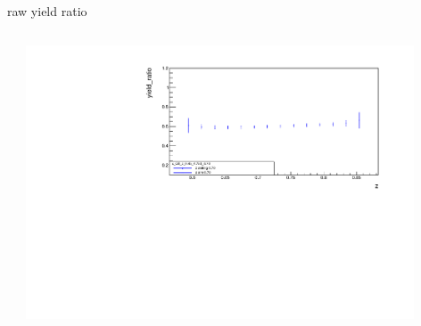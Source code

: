 \begin{frame}{raw yield ratio}
\begin{columns}
\begin{column}[T]{0.5\textwidth}
\end{column}
\begin{column}[T]{0.5\textwidth}
\includegraphics[width = 0.9\textwidth]{results/yield/statistics/x_Q2_z_0.45_4.750_0.70_ratio.pdf}
\end{column}
\end{columns}
\end{frame}
